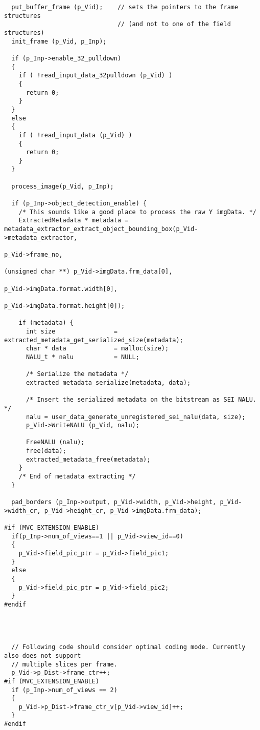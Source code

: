 \begin{lstlisting}
  put_buffer_frame (p_Vid);    // sets the pointers to the frame structures
                               // (and not to one of the field structures)
  init_frame (p_Vid, p_Inp);

  if (p_Inp->enable_32_pulldown)
  {
    if ( !read_input_data_32pulldown (p_Vid) )
    {
      return 0;
    }
  }
  else
  {
    if ( !read_input_data (p_Vid) )
    {
      return 0;
    }
  }

  process_image(p_Vid, p_Inp);

  if (p_Inp->object_detection_enable) {
    /* This sounds like a good place to process the raw Y imgData. */
    ExtractedMetadata * metadata = metadata_extractor_extract_object_bounding_box(p_Vid->metadata_extractor,
                                                                                  p_Vid->frame_no,
                                                                                  (unsigned char **) p_Vid->imgData.frm_data[0],
                                                                                  p_Vid->imgData.format.width[0],
                                                                                  p_Vid->imgData.format.height[0]);

    if (metadata) {
      int size                = extracted_metadata_get_serialized_size(metadata);
      char * data             = malloc(size);
      NALU_t * nalu           = NULL;
     
      /* Serialize the metadata */
      extracted_metadata_serialize(metadata, data);
      
      /* Insert the serialized metadata on the bitstream as SEI NALU. */
      nalu = user_data_generate_unregistered_sei_nalu(data, size);
      p_Vid->WriteNALU (p_Vid, nalu);

      FreeNALU (nalu);
      free(data);
      extracted_metadata_free(metadata);
    }
    /* End of metadata extracting */
  }

  pad_borders (p_Inp->output, p_Vid->width, p_Vid->height, p_Vid->width_cr, p_Vid->height_cr, p_Vid->imgData.frm_data);

#if (MVC_EXTENSION_ENABLE)
  if(p_Inp->num_of_views==1 || p_Vid->view_id==0)
  {
    p_Vid->field_pic_ptr = p_Vid->field_pic1;
  }
  else
  {
    p_Vid->field_pic_ptr = p_Vid->field_pic2;
  }
#endif

  


  // Following code should consider optimal coding mode. Currently also does not support
  // multiple slices per frame.
  p_Vid->p_Dist->frame_ctr++;
#if (MVC_EXTENSION_ENABLE)
  if (p_Inp->num_of_views == 2)
  {
    p_Vid->p_Dist->frame_ctr_v[p_Vid->view_id]++;
  }
#endif


\end{lstlisting}
